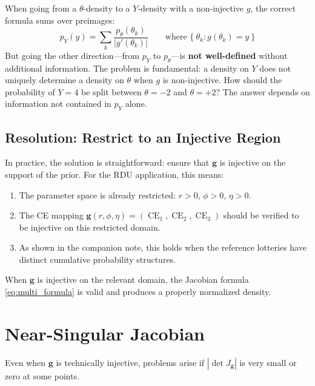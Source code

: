 \documentclass[11pt,a4paper]{article}
\theoremstyle{definition}
\DeclareMathOperator{\CE}{CE}
\begin{document}
When going from a $\theta$-density to a $Y$-density with a non-injective $g$,
the correct formula sums over preimages:
\begin{equation}
    \label{eq:sum_preimages}
    p_Y(y) = \sum_{k} \frac{p_\theta(\theta_k)}{|g'(\theta_k)|}
    \qquad \text{where } \{\ \theta_k : g(\theta_k) = y\ \}
\end{equation}
But going the other direction---from $p_Y$ to $p_\theta$---is
\textbf{not well-defined} without additional information. The problem is
fundamental: a density on $Y$ does not uniquely determine a density on
$\theta$ when $g$ is non-injective. How should the probability of $Y = 4$ be
split between $\theta = -2$ and $\theta = +2$? The answer depends on
information not contained in $p_Y$ alone.

\subsection{Resolution: Restrict to an Injective Region}

In practice, the solution is straightforward: ensure that $\mathbf{g}$ is
injective on the support of the prior. For the RDU application, this means:

\begin{enumerate}
    \item The parameter space is already restricted: $r > 0$, $\phi > 0$,
    $\eta > 0$.
    \item The CE mapping $\mathbf{g}(r, \phi, \eta) = (\CE_1, \CE_2, \CE_3)$
    should be verified to be injective on this restricted domain.
    \item As shown in the companion note, this holds when the reference
    lotteries have distinct cumulative probability structures.
\end{enumerate}

When $\mathbf{g}$ is injective on the relevant domain, the Jacobian formula
\eqref{eq:multi_formula} is valid and produces a properly normalized density.


\section{Near-Singular Jacobian}
\label{sec:near_singular}

Even when $\mathbf{g}$ is technically injective, problems arise if
$|\!\det J_{\mathbf{g}}|$ is very small or zero at some points.
\end{document}
